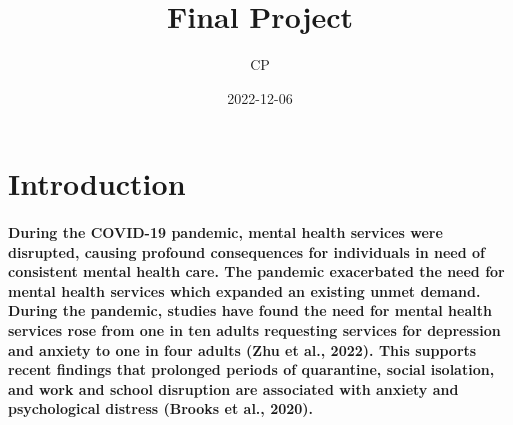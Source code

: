 \documentclass[
  12pt,
]{article}
\title{Final Project}
\author{CP}
\date{2022-12-06}
\begin{document}
\maketitle

\hypertarget{introduction}{%
\section{\texorpdfstring{\textbf{Introduction}}{Introduction}}\label{introduction}}

\hypertarget{during-the-covid-19-pandemic-mental-health-services-were-disrupted-causing-profound-consequences-for-individuals-in-need-of-consistent-mental-health-care.-the-pandemic-exacerbated-the-need-for-mental-health-services-which-expanded-an-existing-unmet-demand.-during-the-pandemic-studies-have-found-the-need-for-mental-health-services-rose-from-one-in-ten-adults-requesting-services-for-depression-and-anxiety-to-one-in-four-adults-zhu-et-al.-2022.-this-supports-recent-findings-that-prolonged-periods-of-quarantine-social-isolation-and-work-and-school-disruption-are-associated-with-anxiety-and-psychological-distress-brooks-et-al.-2020.}{%
\paragraph{During the COVID-19 pandemic, mental health services were
disrupted, causing profound consequences for individuals in need of
consistent mental health care. The pandemic exacerbated the need for
mental health services which expanded an existing unmet demand. During
the pandemic, studies have found the need for mental health services
rose from one in ten adults requesting services for depression and
anxiety to one in four adults (Zhu et al., 2022). This supports recent
findings that prolonged periods of quarantine, social isolation, and
work and school disruption are associated with anxiety and psychological
distress (Brooks et al.,
2020).}\label{during-the-covid-19-pandemic-mental-health-services-were-disrupted-causing-profound-consequences-for-individuals-in-need-of-consistent-mental-health-care.-the-pandemic-exacerbated-the-need-for-mental-health-services-which-expanded-an-existing-unmet-demand.-during-the-pandemic-studies-have-found-the-need-for-mental-health-services-rose-from-one-in-ten-adults-requesting-services-for-depression-and-anxiety-to-one-in-four-adults-zhu-et-al.-2022.-this-supports-recent-findings-that-prolonged-periods-of-quarantine-social-isolation-and-work-and-school-disruption-are-associated-with-anxiety-and-psychological-distress-brooks-et-al.-2020.}}
\end{document}
